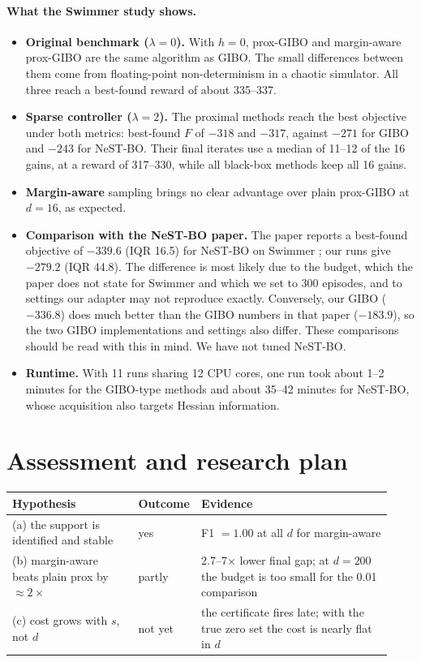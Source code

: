 \documentclass[10pt]{article}
\theoremstyle{remark}
\begin{document}
\paragraph{What the Swimmer study shows.}
\begin{itemize}
\item \textbf{Original benchmark ($\lambda=0$).} With $h=0$, prox-GIBO and margin-aware prox-GIBO are the same algorithm as GIBO. The small
differences between them come from floating-point non-determinism in a chaotic simulator. All three reach a best-found reward of about 335--337.
\item \textbf{Sparse controller ($\lambda=2$).} The proximal methods reach the best objective under both metrics: best-found $F$ of $-318$ and
$-317$, against $-271$ for GIBO and $-243$ for NeST-BO. Their final iterates use a median of 11--12 of the 16 gains, at a reward of 317--330,
while all black-box methods keep all 16 gains.
\item \textbf{Margin-aware} sampling brings no clear advantage over plain prox-GIBO at $d=16$, as expected.
\item \textbf{Comparison with the NeST-BO paper.} The paper reports a best-found objective of $-339.6$ (IQR 16.5) for NeST-BO on Swimmer
\citep{tang2026nestbo}; our runs give $-279.2$ (IQR 44.8). The difference is most likely due to the budget, which the paper does not state for
Swimmer and which we set to 300 episodes, and to settings our adapter may not reproduce exactly. Conversely, our GIBO ($-336.8$) does much better
than the GIBO numbers in that paper ($-183.9$), so the two GIBO implementations and settings also differ. These comparisons should be read
with this in mind. We have not tuned NeST-BO.
\item \textbf{Runtime.} With 11 runs sharing 12 CPU cores, one run took about 1--2 minutes for the GIBO-type methods and about 35--42 minutes
for NeST-BO, whose acquisition also targets Hessian information.
\end{itemize}

\section{Assessment and research plan}\label{sec:plan}

\begin{center}\small
\begin{tabular}{@{}L{0.33\linewidth}L{0.1\linewidth}L{0.5\linewidth}@{}}
\toprule
Hypothesis & Outcome & Evidence\\\midrule
(a) the support is identified and stable & yes & F1 $=1.00$ at all $d$ for margin-aware\\
(b) margin-aware beats plain prox by $\approx2\times$ & partly & 2.7--7$\times$ lower final gap; at $d=200$ the budget is too small for the 0.01 comparison\\
(c) cost grows with $s$, not $d$ & not yet & the certificate fires late; with the true zero set the cost is nearly flat in $d$\\
\bottomrule
\end{tabular}
\end{center}
\end{document}
